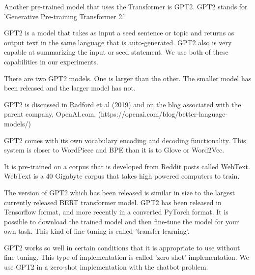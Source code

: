 Another pre-trained model that uses the Transformer is GPT2. GPT2 stands for 'Generative Pre-training Transformer 2.'

GPT2 is a model that takes as input a seed sentence or topic and returns as output text in the same language that is auto-generated. GPT2 also is very capable at summarizing the input or seed statement. We use both of these capabilities in our experiments.

There are two GPT2 models. One is larger than the other. The smaller model has been released and the larger model has not. 

GPT2 is discussed in Radford et al (2019)\cite{radford2019language} and on the blog associated with the parent company, OpenAI.com. (https://openai.com/blog/better-language-models/)

GPT2 comes with its own vocabulary encoding and decoding functionality. This system is closer to
WordPiece and BPE than it is to Glove or Word2Vec.

It is pre-trained on a corpus that is developed from Reddit posts called WebText. WebText is a
40 Gigabyte corpus that takes high powered computers to train.

The version of GPT2 which has been released is similar in size to the largest currently released 
BERT transformer model. GPT2 has been released in Tensorflow format, and more recently in a converted PyTorch format. It is possible to download the trained model and then fine-tune the model for your own task. This kind of fine-tuning is called 'transfer learning'. 

GPT2 works so well in certain conditions that it is appropriate to use without fine tuning. This 
type of implementation is called 'zero-shot' implementation. We use GPT2 in a zero-shot implementation with the chatbot problem.

